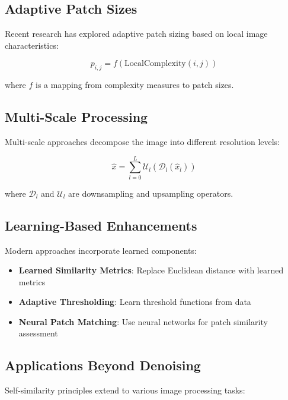 \documentclass[12pt]{article}
\begin{document}
\subsection{Adaptive Patch Sizes}
\label{subsec:adaptive_patches}

Recent research has explored adaptive patch sizing based on local image characteristics:

\begin{equation}
    p_{i,j} = f(\text{LocalComplexity}(i,j))
\end{equation}

where $f$ is a mapping from complexity measures to patch sizes.

\subsection{Multi-Scale Processing}
\label{subsec:multiscale}

Multi-scale approaches decompose the image into different resolution levels:

\begin{equation}
    \hat{x} = \sum_{l=0}^{L} \mathcal{U}_l(\mathcal{D}_l(\hat{x}_l))
\end{equation}

where $\mathcal{D}_l$ and $\mathcal{U}_l$ are downsampling and upsampling operators.

\subsection{Learning-Based Enhancements}
\label{subsec:learning}

Modern approaches incorporate learned components:

\begin{itemize}
    \item \textbf{Learned Similarity Metrics}: Replace Euclidean distance with learned metrics
    \item \textbf{Adaptive Thresholding}: Learn threshold functions from data
    \item \textbf{Neural Patch Matching}: Use neural networks for patch similarity assessment
\end{itemize}

\subsection{Applications Beyond Denoising}
\label{subsec:applications}

Self-similarity principles extend to various image processing tasks:
\end{document}
